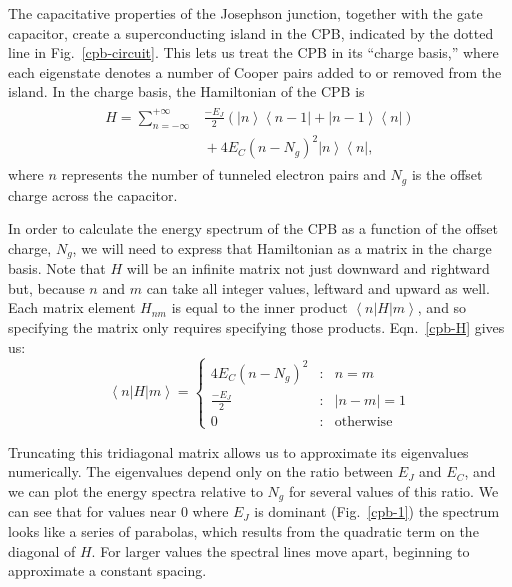 \documentclass[twocolumn]{revtex4}
\newcommand{\bra}[1]{\left< #1 \right|}
\newcommand{\ket}[1]{\left| #1 \right>}
\newcommand{\innerp}[3]{\left< #1 | #2 | #3 \right>}
\begin{document}
The capacitative properties of the Josephson junction, together with
the gate capacitor, create a superconducting island in the CPB,
indicated by the dotted line in Fig.\ \ref{cpb-circuit}. This lets us
treat the CPB in its ``charge basis,'' where each eigenstate denotes
a number of Cooper pairs added to or removed from the island. In the
charge basis, the Hamiltonian of the CPB is
\begin{align}
\label{cpb-H}
\begin{split}
  H = \sum_{n=-\infty}^{+\infty}& \frac{-E_J}{2}\left(
      \ket{n}\bra{n-1} + \ket{n-1}\bra{n} \right) \\
    & {} + 4E_C(n-N_g)^2\ket{n}\bra{n},
\end{split}
\end{align}
where $n$ represents the number of tunneled electron pairs and $N_g$
is the offset charge across the capacitor.

In order to calculate the energy spectrum of the CPB as a function of
the offset charge, $N_g$, we will need to express that Hamiltonian as a
matrix in the charge basis. Note that $H$ will be an infinite matrix
not just downward and rightward but, because $n$ and $m$ can take all
integer values, leftward and upward as well. Each matrix element
$H_{nm}$ is equal to the inner product $\innerp{n}{H}{m}$, and so
specifying the matrix only requires specifying those
products. Eqn.\ \ref{cpb-H} gives us:
\begin{equation}
  \innerp{n}{H}{m} = \left\{\begin{array}{lcr}
        4E_C(n-N_g)^2 & : &n=m \\
        \frac{-E_J}{2} & : &|n-m|=1\\
        0 & : & \text{otherwise}
        \end{array}\right.
\end{equation}

Truncating this tridiagonal matrix allows us to approximate its
eigenvalues numerically. The eigenvalues depend only on the ratio
between $E_J$ and $E_C$, and we can plot the energy spectra relative
to $N_g$ for several values of this ratio. We can see that for values
near $0$ where $E_J$ is dominant (Fig.\ \ref{cpb-1}) the spectrum
looks like a series of parabolas, which results from the quadratic
term on the diagonal of $H$. For larger values the spectral lines move apart,
beginning to approximate a constant spacing.
\end{document}
